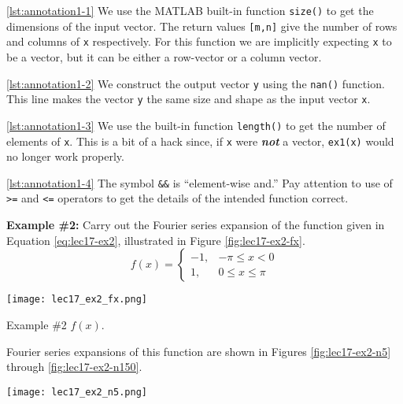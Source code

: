 \vspace{0.25cm}

\noindent \ref{lst:annotation1-1}  We use the MATLAB built-in function \lstinline[style=myMatlab]{size()} to get the dimensions of the input vector.  The return values \lstinline{[m,n]} give the number of rows and columns of \lstinline{x} respectively. For this function we are implicitly expecting \lstinline{x} to be a vector, but it can be either a row-vector or a column vector.

\vspace{0.25cm}

\noindent \ref{lst:annotation1-2} We construct the output vector \lstinline{y} using the \lstinline{nan()} function.  This line makes the vector \lstinline{y} the same size and shape as the input vector \lstinline{x}.  


\vspace{0.25cm}

\noindent \ref{lst:annotation1-3} We use the built-in function \lstinline[style=myMatlab]{length()} to get the number of elements of \lstinline{x}.  This is a bit of a hack since, if \lstinline{x} were \textbf{\emph{not}} a vector, \lstinline{ex1(x)} would no longer work properly.

\vspace{0.25cm}

\noindent \ref{lst:annotation1-4} The symbol \lstinline{&&} is ``element-wise and.''  Pay attention to use of \lstinline{>=} and \lstinline{<=} operators to get the details of the intended function correct.

\vspace{0.5cm}

\noindent\textbf{Example \#2:}  Carry out the Fourier series expansion of the function given in Equation \ref{eq:lec17-ex2}, illustrated in Figure \ref{fig:lec17-ex2-fx}.
\begin{equation}
f(x) = 
\begin{cases}
-1, & -\pi \le x < 0 \\
1, & 0 \le x \le \pi
\end{cases}
\label{eq:lec17-ex2}
\end{equation}
\begin{marginfigure}[-6.0cm]
\texttt{[image: lec17\_ex2\_fx.png]}
\caption{Example \#2 $f(x)$.}
\label{fig:lec17-ex2-fx}
\end{marginfigure}
Fourier series expansions of this function are shown in Figures \ref{fig:lec17-ex2-n5} through \ref{fig:lec17-ex2-n150}.
\begin{marginfigure}[-1.0cm]
\texttt{[image: lec17\_ex2\_n5.png]}
\caption{Fourier series expansion with \lstinline{N=5}.}
\label{fig:lec17-ex2-n5}
\end{marginfigure}

